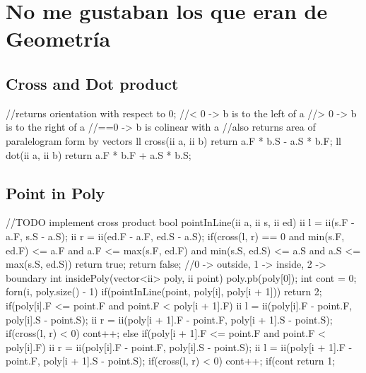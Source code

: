 \documentclass[10pt, landscape, twocolumn, a4paper, notitlepage]{article}
\begin{document}
\section{No me gustaban los que eran de Geometr\'ia}
\subsection{Cross and Dot product}
\begin{code}
//returns orientation with respect to 0; 
//< 0 -> b is to the left of a
//> 0 -> b is to the right of a
//==0 -> b is colinear with a
//also returns area of paralelogram form by vectors
ll cross(ii a, ii b) {
    return a.F * b.S - a.S * b.F;
}
ll dot(ii a, ii b) {
    return a.F * b.F + a.S * b.S;
}
\end{code}
\subsection{Point in Poly}
\begin{code}
//TODO implement cross product
bool pointInLine(ii a, ii s, ii ed) {
    ii l = ii(s.F - a.F, s.S - a.S);
    ii r = ii(ed.F - a.F, ed.S - a.S);
    if(cross(l, r) == 0 and min(s.F, ed.F) <= a.F and a.F <= max(s.F, ed.F)
        and min(s.S, ed.S) <= a.S and a.S <= max(s.S, ed.S)) 
        return true;
    return false;
}
//0 -> outside, 1 -> inside, 2 -> boundary
int insidePoly(vector<ii> poly, ii point) {
    poly.pb(poly[0]);
    int cont = 0;
    forn(i, poly.size() - 1) {
        if(pointInLine(point, poly[i], poly[i + 1])) return 2;
        if(poly[i].F <= point.F and point.F < poly[i + 1].F) {
            ii l = ii(poly[i].F - point.F, poly[i].S - point.S);
            ii r = ii(poly[i + 1].F - point.F, poly[i + 1].S - point.S);
            if(cross(l, r) < 0) cont++;
        }
        else if(poly[i + 1].F <= point.F and point.F < poly[i].F) {
            ii r = ii(poly[i].F - point.F, poly[i].S - point.S);
            ii l = ii(poly[i + 1].F - point.F, poly[i + 1].S - point.S);
            if(cross(l, r) < 0) cont++;
        }
    }
    if(cont%
    return 1;
}
\end{code}
\end{document}
